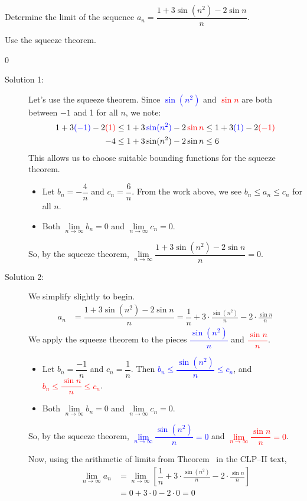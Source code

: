 \begin{question}
Determine the limit of the sequence
$a_n = \dfrac{1+3\sin(n^2)-2\sin n}{n}$.
\end{question}
\begin{hint}
Use the squeeze theorem.
\end{hint}
\begin{answer}
0
\end{answer}
\begin{solution}
\begin{description}
\item[Solution 1:] Let's use the squeeze theorem. Since \textcolor{blue}{$\sin (n^2)$} and \textcolor{red}{$\sin n$} are both between $-1$ and 1 for all $n$, we note:
\begin{align*}
1 +3\textcolor{blue}{(-1)}-2\textcolor{red}{(1)}&\leq 1+3\,\textcolor{blue}{\sin(n^2)}-2\,\textcolor{red}{\sin n} \leq 1 +3\textcolor{blue}{(1)}-2\textcolor{red}{(-1)}\\
-4&\leq 1+3\,{\sin(n^2)}-2\,{\sin n} \leq 6
\end{align*}
This allows us to choose suitable bounding functions for the squeeze theorem.
\begin{itemize}
\item Let $b_n = -\dfrac{4}{n}$ and $c_n = \dfrac{6}{n}$. From the work above, we see
$b_n \leq a_n \leq c_n$ for all $n$.
\item Both $\lim\limits_{n \to \infty}b_n=0$ and $\lim\limits_{n \to \infty}c_n=0$.
\end{itemize}
So, by the squeeze theorem,
$\lim\limits_{n \to \infty} \dfrac{1+3\sin(n^2)-2\sin n}{n}=0$.

\item[Solution 2:] We simplify slightly to begin.
\begin{align*}
a_n &= \dfrac{1+3\sin(n^2)-2\sin n}{n} = \dfrac{1}{n}+3\cdot\frac{\sin (n^2)}{n} - 2\cdot\frac{\sin n}{n}
\end{align*}
We  apply the squeeze theorem to the pieces \textcolor{blue}{$\dfrac{\sin (n^2)}{n} $} and \textcolor{red}{$\dfrac{\sin n}{n}$}.
\begin{itemize}
\item Let $b_n = \dfrac{-1}{n}$ and $c_n = \dfrac{1}{n}$. Then \textcolor{blue}{$b_n \leq \dfrac{\sin (n^2)}{n}  \leq c_n$}, and \textcolor{red}{$b_n \leq  \dfrac{\sin n}{n} \leq c_n$}.
\item Both $\lim\limits_{n \to \infty} b_n=0$ and $\lim\limits_{n \to \infty} c_n=0$.
\end{itemize}
So, by the squeeze theorem, \textcolor{blue}{$\lim\limits_{n \to \infty}\dfrac{\sin (n^2)}{n} =0$} and \textcolor{red}{$\lim\limits_{n \to \infty}\dfrac{\sin n}{n}=0$}.

Now, using the arithmetic of limits from Theorem~ in the CLP--II text,
\begin{align*}
\lim_{n \to \infty}a_n &=\lim_{n \to \infty}\left[ \dfrac{1}{n}+3\cdot\frac{\sin (n^2)}{n} - 2\cdot\frac{\sin n}{n}\right]\\
&=0+3\cdot 0 - 2\cdot 0 =0
\end{align*}
\end{description}
\end{solution}
